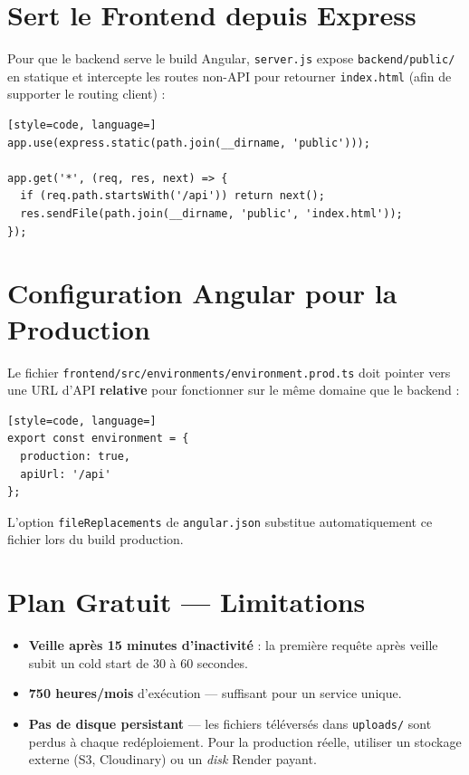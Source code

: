 \documentclass[12pt,a4paper]{report}
\begin{document}
\section{Sert le Frontend depuis Express}

Pour que le backend serve le build Angular, \texttt{server.js} expose \texttt{backend/public/} en statique et intercepte les routes non-API pour retourner \texttt{index.html} (afin de supporter le routing client) :

\begin{lstlisting}[style=code, language=]
app.use(express.static(path.join(__dirname, 'public')));

app.get('*', (req, res, next) => {
  if (req.path.startsWith('/api')) return next();
  res.sendFile(path.join(__dirname, 'public', 'index.html'));
});
\end{lstlisting}

\section{Configuration Angular pour la Production}

Le fichier \texttt{frontend/src/environments/environment.prod.ts} doit pointer vers une URL d'API \textbf{relative} pour fonctionner sur le même domaine que le backend :

\begin{lstlisting}[style=code, language=]
export const environment = {
  production: true,
  apiUrl: '/api'
};
\end{lstlisting}

L'option \texttt{fileReplacements} de \texttt{angular.json} substitue automatiquement ce fichier lors du build production.

\section{Plan Gratuit — Limitations}

\begin{itemize}[leftmargin=*,itemsep=2pt]
  \item \textbf{Veille après 15 minutes d'inactivité} : la première requête après veille subit un cold start de 30 à 60 secondes.
  \item \textbf{750 heures/mois} d'exécution — suffisant pour un service unique.
  \item \textbf{Pas de disque persistant} — les fichiers téléversés dans \texttt{uploads/} sont perdus à chaque redéploiement. Pour la production réelle, utiliser un stockage externe (S3, Cloudinary) ou un \textit{disk} Render payant.
\end{itemize}
\end{document}
